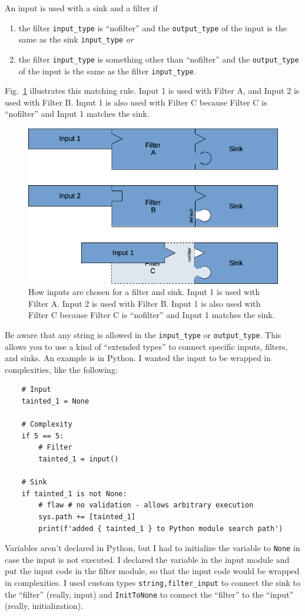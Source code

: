 \documentclass[12pt]{article}
\begin{document}
An input is used with a sink and a filter if
\begin{enumerate}[nosep]
\item the filter \verb|input_type| is ``nofilter'' and the \verb|output_type|
  of the input is the same as the sink \verb|input_type| \emph{or}
\item the filter \verb|input_type| is something other than ``nofilter'' and the
  \verb|output_type| of the input is the same as the filter \verb|input_type|.
\end{enumerate}
Fig.~\ref{fig:how inputs fit} illustrates this matching rule.  Input 1 is used with
Filter A, and Input 2 is used with Filter B.  Input 1 is also used with Filter C
because Filter C is ``nofilter'' and Input 1 matches the sink.
\begin{figure}[htbp]
  \centerline{\includegraphics[width=.667\linewidth]{fig_inputs_filters_and_sinks.png}}
  \caption{How inputs are chosen for a filter and sink.  Input 1 is used with
    Filter A.  Input 2 is used with Filter B.  Input 1 is also used with Filter C
    because Filter C is ``nofilter'' and Input 1 matches the sink.
  }
  \label{fig:how inputs fit}
\end{figure}

Be aware that any string is allowed in the \verb|input_type| or \verb|output_type|.
This allows you to use a kind of ``extended types'' to connect specific inputs,
filters, and sinks.  An example is in Python.  I wanted the input to be wrapped in
complexities, like the following:
\begin{verbatim}
    # Input
    tainted_1 = None

    # Complexity
    if 5 == 5:
        # Filter
        tainted_1 = input()

    # Sink
    if tainted_1 is not None:
        # flaw # no validation - allows arbitrary execution
        sys.path += [tainted_1]
        print(f'added { tainted_1 } to Python module search path')
\end{verbatim}
Variables aren't declared in Python, but I had to initialize the variable to
\verb|None| in case the input is not executed.  I declared the variable in the input
module and put the input code in the filter module, so that the input code would be
wrapped in complexities.  I used custom types \verb|string,filter_input| to connect
the sink to the ``filter'' (really, input) and \verb|InitToNone| to connect the
``filter'' to the ``input'' (really, initialization).
\end{document}
